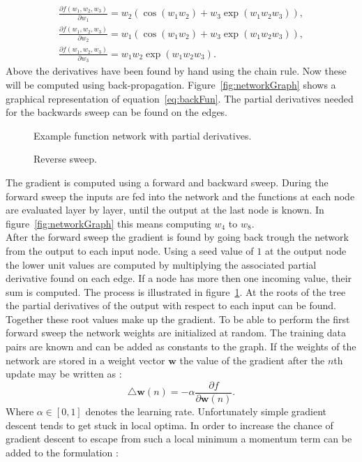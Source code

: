 \begin{align}
\frac{\partial f(w_1,w_2,w_3)}{\partial w_1} = w_2 (\cos(w_1 w_2) + w_3 \exp(w_1 w_2 w_3)), \\
\frac{\partial f(w_1,w_2,w_3)}{\partial w_2} = w_1 (\cos(w_1 w_2) + w_3 \exp(w_1 w_2 w_3)), \\
\frac{\partial f(w_1,w_2,w_3)}{\partial w_3} = w_1  w_2 \exp(w_1 w_2 w_3).
\end{align}
Above the derivatives have been found by hand using the chain rule. Now these will be computed using back-propagation. Figure~\ref{fig:networkGraph} shows a graphical representation of equation~\ref{eq:backFun}. The partial derivatives needed for the backwards sweep can be found on the edges. \\
\begin{figure}
\centering

\caption{Example function network with partial derivatives.}
\label{fig:networkGraph}

\caption{Reverse sweep.}
\label{fig:reverseSweep}
\end{figure}
The gradient is computed using a forward and backward sweep. During the forward sweep the inputs are fed into the network and the functions at each node are evaluated layer by layer, until the output at the last node is known. In figure~\ref{fig:networkGraph} this means computing $w_4$ to $w_8$. \\
After the forward sweep the gradient is found by going back trough the network from the output to each input node. Using a seed value of $1$ at the output node the lower unit values are computed by multiplying the associated partial derivative found on each edge. If a node has more then one incoming value, their sum is computed. The process is illustrated in figure~\ref{fig:reverseSweep}. At the roots of the tree the partial derivatives of the output with respect to each input can be found. Together these root values make up the gradient.
To be able to perform the first forward sweep the network weights are initialized at random. The training data pairs are known and can be added as constants to the graph.
If the weights of the network are stored in a weight vector $\mathbf{w}$ the value of the gradient after the $n$th update may be written as \cite[page 27]{Graves2008}:
\begin{equation}
\triangle \mathbf{w}(n) = -\alpha \frac{\partial f}{\partial \mathbf{w}(n)}.
\end{equation}
Where $\alpha \in [0,1]$ denotes the learning rate. Unfortunately simple gradient descent tends to get stuck in local optima. In order to increase the chance of gradient descent to escape from such a local minimum a momentum term can be added to the formulation \cite[page 267]{Bishop1995}\cite[page 27]{Graves2008}:
